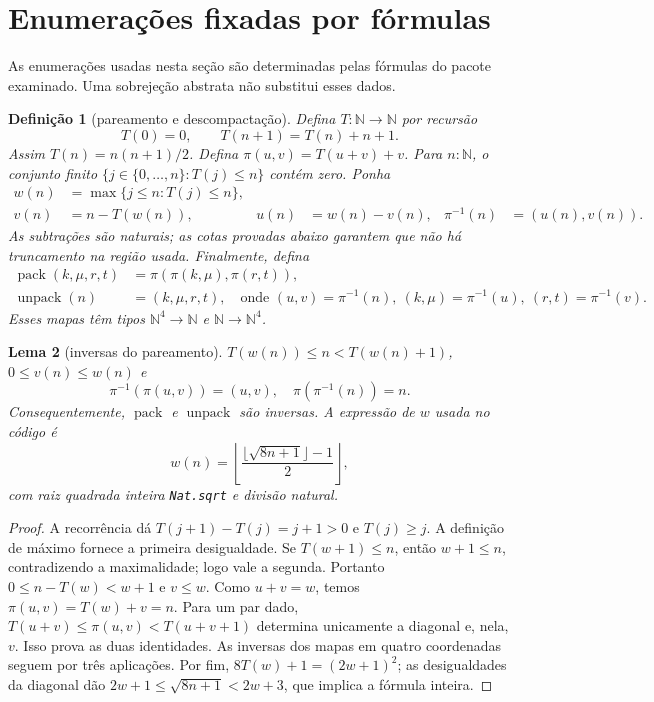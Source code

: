 \documentclass[11pt,a4paper]{article}
\newtheorem{definicao}{Definição}[section]
\newtheorem{lema}[definicao]{Lema}
\newcommand{\N}{\mathbb N}
\newcommand{\code}[1]{\nolinkurl{#1}}
\begin{document}
\section{Enumerações fixadas por fórmulas}
\label{sec:enumeration}

As enumerações usadas nesta seção são determinadas pelas fórmulas do
pacote examinado. Uma sobrejeção abstrata não substitui esses dados.

\begin{definicao}[pareamento e descompactação]
Defina $T:\N\to\N$ por recursão
\[
 T(0)=0,\qquad T(n+1)=T(n)+n+1.
\]
Assim $T(n)=n(n+1)/2$. Defina
$\pi(u,v)=T(u+v)+v$. Para $n:\N$, o conjunto finito
$\{j\in\{0,\ldots,n\}:T(j)\le n\}$ contém zero. Ponha
\begin{align*}
 w(n)&=\max\{j\le n:T(j)\le n\},\\
 v(n)&=n-T(w(n)),& u(n)&=w(n)-v(n),&
 \pi^{-1}(n)&=(u(n),v(n)).
\end{align*}
As subtrações são naturais; as cotas provadas abaixo garantem que não
há truncamento na região usada. Finalmente, defina
\begin{align*}
 \operatorname{pack}(k,\mu,r,t)&=\pi(\pi(k,\mu),\pi(r,t)),\\
 \operatorname{unpack}(n)&=(k,\mu,r,t),
 \quad\text{onde }(u,v)=\pi^{-1}(n),\ (k,\mu)=\pi^{-1}(u),\
 (r,t)=\pi^{-1}(v).
\end{align*}
Esses mapas têm tipos $\N^4\to\N$ e $\N\to\N^4$.
\end{definicao}

\begin{lema}[inversas do pareamento]\label{lem:pair}
$T(w(n))\le n<T(w(n)+1)$, $0\le v(n)\le w(n)$ e
\[
 \pi^{-1}(\pi(u,v))=(u,v),\quad
 \pi(\pi^{-1}(n))=n.
\]
Consequentemente, $\operatorname{pack}$ e $\operatorname{unpack}$
são inversas. A expressão de $w$ usada no código é
\[
 w(n)=\left\lfloor
 \frac{\lfloor\sqrt{8n+1}\rfloor-1}{2}\right\rfloor,
\]
com raiz quadrada inteira \code{Nat.sqrt} e divisão natural.
\end{lema}
\begin{proof}
A recorrência dá $T(j+1)-T(j)=j+1>0$ e $T(j)\ge j$.
A definição de máximo fornece a primeira desigualdade. Se
$T(w+1)\le n$, então $w+1\le n$, contradizendo a maximalidade;
logo vale a segunda. Portanto $0\le n-T(w)<w+1$ e $v\le w$.
Como $u+v=w$, temos $\pi(u,v)=T(w)+v=n$.
Para um par dado, $T(u+v)\le\pi(u,v)<T(u+v+1)$ determina
unicamente a diagonal e, nela, $v$. Isso prova as duas identidades.
As inversas dos mapas em quatro coordenadas seguem por três aplicações.
Por fim, $8T(w)+1=(2w+1)^2$; as desigualdades da diagonal dão
$2w+1\le\sqrt{8n+1}<2w+3$, que implica a fórmula inteira.
\end{proof}
\end{document}
